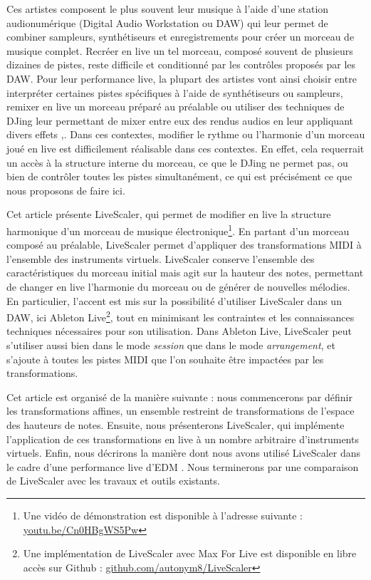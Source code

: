 \documentclass{article}
\begin{document}
Ces artistes composent le plus souvent leur musique à l’aide d’une station audionumérique (Digital Audio Workstation ou DAW) qui leur permet de combiner sampleurs, synthétiseurs et enregistrements pour créer un morceau de musique complet. Recréer en live un tel morceau, composé souvent de plusieurs dizaines de pistes, reste difficile et conditionné par les contrôles proposés par les DAW. Pour leur performance live, la plupart des artistes vont ainsi choisir entre interpréter certaines pistes spécifiques à l'aide de synthétiseurs ou sampleurs, remixer en live un morceau préparé au préalable ou utiliser des techniques de DJing leur permettant de mixer entre eux des rendus audios en leur appliquant divers effets \cite{ferreira2008sound},\cite{magana2018performance}.  Dans ces contextes,  modifier le rythme ou l'harmonie d’un morceau joué en live est difficilement réalisable dans ces contextes. En effet, cela requerrait un accès à la structure interne du morceau, ce que le DJing ne permet pas, ou bien de contrôler toutes les pistes simultanément, ce qui est précisément ce que nous proposons de faire ici.

Cet article présente LiveScaler, qui per\-met de modifier en live la structure harmonique d'un morceau de musique électronique\footnote{Une vidéo de démonstration est disponible à l'adresse suivante : \href{ https://youtu.be/Cn0HBgWS5Pw}{youtu.be/Cn0HBgWS5Pw}}. En partant d'un morceau composé au préalable, LiveScaler permet d'appliquer des transformations MIDI à l'ensemble des instruments virtuels. LiveScaler conserve l'ensemble des caractéristiques du morceau initial mais agit sur la hauteur des notes, permettant de changer en live l'harmonie du morceau ou de générer de nouvelles mélodies. En particulier, l'accent est mis sur la possibilité d'utiliser LiveScaler dans un DAW, ici Ableton Live\footnote{Une implémentation de LiveScaler avec Max For Live est disponible en libre accès sur Github : \href{https://github.com/autonym8/LiveScaler}{github.com/autonym8/LiveScaler}}, tout en minimisant les contraintes et les connaissances techniques nécessaires pour son utilisation. Dans Ableton Live, LiveScaler peut s'utiliser aussi bien dans le mode \emph{session} que dans le mode \emph{arrangement}, et s'ajoute à toutes les pistes MIDI que l'on souhaite être impactées par les transformations.

Cet article est organisé de la manière suivante : nous commencerons par définir les transformations affines, un ensemble restreint de transformations de l'espace des hauteurs de notes. Ensuite, nous présenterons Live\-Scaler, qui implémente l'application de ces transformations en live à un nombre arbitraire d'instruments virtuels. Enfin, nous décrirons la manière dont nous avons utilisé LiveScaler dans le cadre d'une performance live d'EDM . Nous terminerons par une comparaison de LiveScaler avec les travaux et outils existants.
\end{document}
